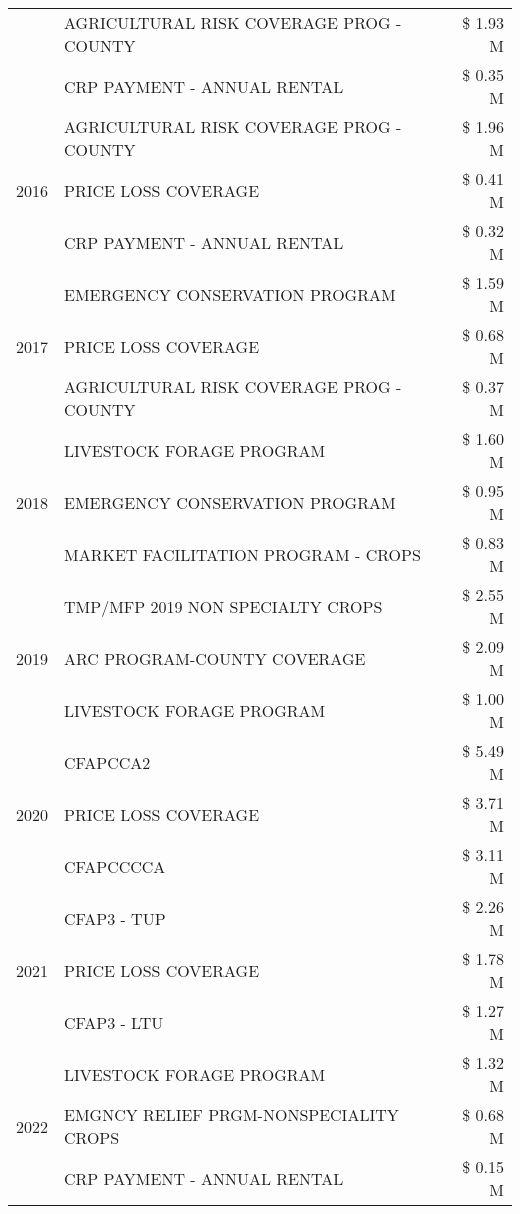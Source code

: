\begin{tabular}{llr}
 & AGRICULTURAL RISK COVERAGE PROG - COUNTY & \$ 1.93 M \\
 & CRP PAYMENT - ANNUAL RENTAL & \$ 0.35 M \\
\cline{1-3}
\multirow[t]{3}{*}{2016} & AGRICULTURAL RISK COVERAGE PROG - COUNTY & \$ 1.96 M \\
 & PRICE LOSS COVERAGE & \$ 0.41 M \\
 & CRP PAYMENT - ANNUAL RENTAL & \$ 0.32 M \\
\cline{1-3}
\multirow[t]{3}{*}{2017} & EMERGENCY CONSERVATION PROGRAM & \$ 1.59 M \\
 & PRICE LOSS COVERAGE & \$ 0.68 M \\
 & AGRICULTURAL RISK COVERAGE PROG - COUNTY & \$ 0.37 M \\
\cline{1-3}
\multirow[t]{3}{*}{2018} & LIVESTOCK FORAGE PROGRAM & \$ 1.60 M \\
 & EMERGENCY CONSERVATION PROGRAM & \$ 0.95 M \\
 & MARKET FACILITATION PROGRAM - CROPS & \$ 0.83 M \\
\cline{1-3}
\multirow[t]{3}{*}{2019} & TMP/MFP 2019 NON SPECIALTY CROPS & \$ 2.55 M \\
 & ARC PROGRAM-COUNTY COVERAGE & \$ 2.09 M \\
 & LIVESTOCK FORAGE PROGRAM & \$ 1.00 M \\
\cline{1-3}
\multirow[t]{3}{*}{2020} & CFAPCCA2 & \$ 5.49 M \\
 & PRICE LOSS COVERAGE & \$ 3.71 M \\
 & CFAPCCCCA & \$ 3.11 M \\
\cline{1-3}
\multirow[t]{3}{*}{2021} & CFAP3 - TUP & \$ 2.26 M \\
 & PRICE LOSS COVERAGE & \$ 1.78 M \\
 & CFAP3 - LTU & \$ 1.27 M \\
\cline{1-3}
\multirow[t]{3}{*}{2022} & LIVESTOCK FORAGE PROGRAM & \$ 1.32 M \\
 & EMGNCY RELIEF PRGM-NONSPECIALITY CROPS & \$ 0.68 M \\
 & CRP PAYMENT - ANNUAL RENTAL & \$ 0.15 M \\
\cline{1-3}
\bottomrule
\end{tabular}

